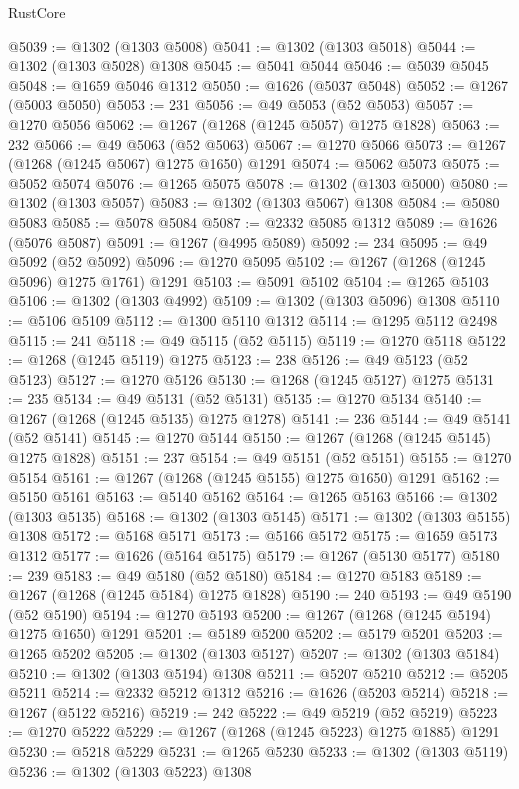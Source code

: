 \begin{lexlean}{RustCore}
\begin{coremodule}
@5039 := @1302 (@1303 @5008)
@5041 := @1302 (@1303 @5018)
@5044 := @1302 (@1303 @5028) @1308
@5045 := @5041 @5044
@5046 := @5039 @5045
@5048 := @1659 @5046 @1312
@5050 := @1626 (@5037 @5048)
@5052 := @1267 (@5003 @5050)
@5053 := 231
@5056 := @49 @5053 (@52 @5053)
@5057 := @1270 @5056
@5062 := @1267 (@1268 (@1245 @5057) @1275 @1828)
@5063 := 232
@5066 := @49 @5063 (@52 @5063)
@5067 := @1270 @5066
@5073 := @1267 (@1268 (@1245 @5067) @1275 @1650) @1291
@5074 := @5062 @5073
@5075 := @5052 @5074
@5076 := @1265 @5075
@5078 := @1302 (@1303 @5000)
@5080 := @1302 (@1303 @5057)
@5083 := @1302 (@1303 @5067) @1308
@5084 := @5080 @5083
@5085 := @5078 @5084
@5087 := @2332 @5085 @1312
@5089 := @1626 (@5076 @5087)
@5091 := @1267 (@4995 @5089)
@5092 := 234
@5095 := @49 @5092 (@52 @5092)
@5096 := @1270 @5095
@5102 := @1267 (@1268 (@1245 @5096) @1275 @1761) @1291
@5103 := @5091 @5102
@5104 := @1265 @5103
@5106 := @1302 (@1303 @4992)
@5109 := @1302 (@1303 @5096) @1308
@5110 := @5106 @5109
@5112 := @1300 @5110 @1312
@5114 := @1295 @5112 @2498
@5115 := 241
@5118 := @49 @5115 (@52 @5115)
@5119 := @1270 @5118
@5122 := @1268 (@1245 @5119) @1275
@5123 := 238
@5126 := @49 @5123 (@52 @5123)
@5127 := @1270 @5126
@5130 := @1268 (@1245 @5127) @1275
@5131 := 235
@5134 := @49 @5131 (@52 @5131)
@5135 := @1270 @5134
@5140 := @1267 (@1268 (@1245 @5135) @1275 @1278)
@5141 := 236
@5144 := @49 @5141 (@52 @5141)
@5145 := @1270 @5144
@5150 := @1267 (@1268 (@1245 @5145) @1275 @1828)
@5151 := 237
@5154 := @49 @5151 (@52 @5151)
@5155 := @1270 @5154
@5161 := @1267 (@1268 (@1245 @5155) @1275 @1650) @1291
@5162 := @5150 @5161
@5163 := @5140 @5162
@5164 := @1265 @5163
@5166 := @1302 (@1303 @5135)
@5168 := @1302 (@1303 @5145)
@5171 := @1302 (@1303 @5155) @1308
@5172 := @5168 @5171
@5173 := @5166 @5172
@5175 := @1659 @5173 @1312
@5177 := @1626 (@5164 @5175)
@5179 := @1267 (@5130 @5177)
@5180 := 239
@5183 := @49 @5180 (@52 @5180)
@5184 := @1270 @5183
@5189 := @1267 (@1268 (@1245 @5184) @1275 @1828)
@5190 := 240
@5193 := @49 @5190 (@52 @5190)
@5194 := @1270 @5193
@5200 := @1267 (@1268 (@1245 @5194) @1275 @1650) @1291
@5201 := @5189 @5200
@5202 := @5179 @5201
@5203 := @1265 @5202
@5205 := @1302 (@1303 @5127)
@5207 := @1302 (@1303 @5184)
@5210 := @1302 (@1303 @5194) @1308
@5211 := @5207 @5210
@5212 := @5205 @5211
@5214 := @2332 @5212 @1312
@5216 := @1626 (@5203 @5214)
@5218 := @1267 (@5122 @5216)
@5219 := 242
@5222 := @49 @5219 (@52 @5219)
@5223 := @1270 @5222
@5229 := @1267 (@1268 (@1245 @5223) @1275 @1885) @1291
@5230 := @5218 @5229
@5231 := @1265 @5230
@5233 := @1302 (@1303 @5119)
@5236 := @1302 (@1303 @5223) @1308

\end{coremodule}
\end{lexlean}
